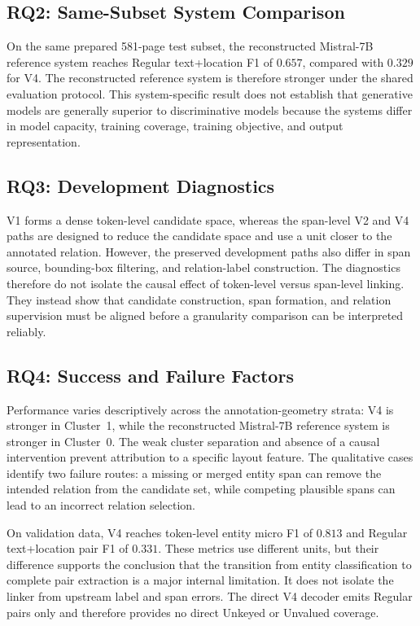 \subsection{RQ2: Same-Subset System Comparison}

On the same prepared 581-page test subset, the reconstructed Mistral-7B
reference system reaches Regular text+location F1 of $0.657$, compared with
$0.329$ for V4. The reconstructed reference system is therefore stronger under
the shared evaluation protocol. This system-specific result does not establish
that generative models are generally superior to discriminative models because
the systems differ in model capacity, training coverage, training objective,
and output representation.

\subsection{RQ3: Development Diagnostics}

V1 forms a dense token-level candidate space, whereas the span-level V2 and V4
paths are designed to reduce the candidate space and use a unit closer to the
annotated relation. However, the preserved development paths also differ in
span source, bounding-box filtering, and relation-label construction. The
diagnostics therefore do not isolate the causal effect of token-level versus
span-level linking. They instead show that candidate construction, span
formation, and relation supervision must be aligned before a granularity
comparison can be interpreted reliably.

\subsection{RQ4: Success and Failure Factors}

Performance varies descriptively across the annotation-geometry strata: V4 is
stronger in Cluster~1, while the reconstructed Mistral-7B reference system is
stronger in Cluster~0. The weak cluster separation and absence of a causal
intervention prevent attribution to a specific layout feature. The qualitative
cases identify two failure routes: a missing or merged entity span can remove
the intended relation from the candidate set, while competing plausible spans
can lead to an incorrect relation selection.

On validation data, V4 reaches token-level entity micro F1 of $0.813$ and
Regular text+location pair F1 of $0.331$. These metrics use different units,
but their difference supports the conclusion that the transition from entity
classification to complete pair extraction is a major internal limitation. It
does not isolate the linker from upstream label and span errors. The direct V4
decoder emits Regular pairs only and therefore provides no direct Unkeyed or
Unvalued coverage.

